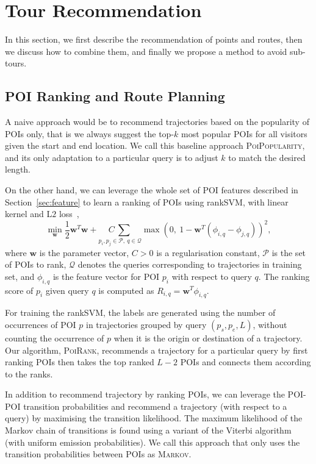 \section{Tour Recommendation}
\label{sec:recommendation}

In this section, we first describe the recommendation of points and routes,
then we discuss how to combine them, and finally we propose a method to avoid sub-tours.

\subsection{POI Ranking and Route Planning}
\label{sec:rankplan}

A naive approach would be to recommend trajectories based on the popularity of POIs only,
that is we always suggest the top-$k$ most popular POIs for all visitors given the start and end location.
We call this baseline approach \textsc{PoiPopularity},
and its only adaptation to a particular query is to adjust $k$ to match the desired length.

On the other hand, we can leverage the whole set of POI features described in Section~\ref{sec:feature}
to learn a ranking of POIs using rankSVM, with linear kernel and L$2$ loss~\cite{lranksvm},
\begin{equation*}
\min_{\mathbf{w}} \frac{1}{2}
                  \mathbf{w}^T \mathbf{w} +
                  \underset{p_i, p_j \in \mathcal{P},~ q \in \mathcal{Q}}{C ~\sum}
                  \max \left( 0,~ 1 - \mathbf{w}^T (\phi_{i,q} - \phi_{j,q}) \right)^2,
\end{equation*}
where $\mathbf{w}$ is the parameter vector,
$C > 0$ is a regularisation constant,
$\mathcal{P}$ is the set of POIs to rank,
$\mathcal{Q}$ denotes the queries corresponding to trajectories in training set,
and $\phi_{i,q}$ is the feature vector for POI $p_i$ with respect to query $q$. 
The ranking score of $p_i$ given query $q$ is computed as $R_{i,q} =\mathbf{w}^T \phi_{i,q}$. 

For training the rankSVM, the labels are generated using the number of occurrences of
POI $p$ in trajectories grouped by query $(p_s, p_e, L)$,
without counting the occurrence of $p$ when it is the origin or destination of a trajectory.
Our algorithm, \textsc{PoiRank}, recommends a trajectory for a particular query
by first ranking POIs then takes the top ranked $L-2$ POIs and connects them according to the ranks.


In addition to recommend trajectory by ranking POIs, we can leverage the POI-POI transition probabilities and
recommend a trajectory (with respect to a query) by maximising the transition likelihood.
The maximum likelihood of the Markov chain of transitions is found using a variant of the Viterbi algorithm (with uniform emission probabilities).
We call this approach that only uses the transition probabilities between POIs as \textsc{Markov}.


